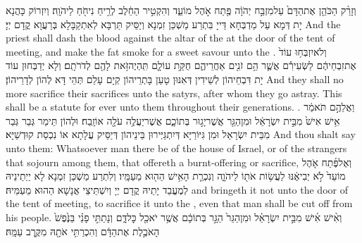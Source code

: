 {וְזָרַ֨ק הַכֹּהֵ֤ן אֶת\maqqaf הַדָּם֙ עַל\maqqaf מִזְבַּ֣ח יְהֹוָ֔ה פֶּ֖תַח אֹ֣הֶל מוֹעֵ֑ד וְהִקְטִ֣יר הַחֵ֔לֶב לְרֵ֥יחַ נִיחֹ֖חַ לַיהֹוָֽה׃}
{וְיִזְרוֹק כָּהֲנָא יָת דְּמָא עַל מַדְבְּחָא דַּייָ בִּתְרַע מַשְׁכַּן זִמְנָא וְיַסֵּיק תַּרְבָּא לְאִתְקַבָּלָא בְּרַעֲוָא קֳדָם יְיָ׃}
{And the priest shall dash the blood against the altar of the \lord\space at the door of the tent of meeting, and make the fat smoke for a sweet savour unto the \lord.}{}
{וְלֹא\maqqaf יִזְבְּח֥וּ עוֹד֙ אֶת\maqqaf זִבְחֵיהֶ֔ם לַשְּׂעִירִ֕ם אֲשֶׁ֛ר הֵ֥ם זֹנִ֖ים אַחֲרֵיהֶ֑ם חֻקַּ֥ת עוֹלָ֛ם תִּֽהְיֶה\maqqaf זֹּ֥את לָהֶ֖ם לְדֹרֹתָֽם׃}
{וְלָא יְדַבְּחוּן עוֹד יָת דִּבְחֵיהוֹן לְשֵׁידִין דְּאִנּוּן טָעַן בָּתְרֵיהוֹן קְיָם עָלַם תְּהֵי דָּא לְהוֹן לְדָרֵיהוֹן׃}
{And they shall no more sacrifice their sacrifices unto the satyrs, after whom they go astray. This shall be a statute for ever unto them throughout their generations. .}{}
{וַאֲלֵהֶ֣ם תֹּאמַ֔ר אִ֥ישׁ אִישׁ֙ מִבֵּ֣ית יִשְׂרָאֵ֔ל וּמִן\maqqaf הַגֵּ֖ר אֲשֶׁר\maqqaf יָג֣וּר בְּתוֹכָ֑ם אֲשֶׁר\maqqaf יַעֲלֶ֥ה עֹלָ֖ה אוֹ\maqqaf זָֽבַח׃}
{וּלְהוֹן תֵּימַר גְּבַר גְּבַר מִבֵּית יִשְׂרָאֵל וּמִן גִּיּוֹרַיָּא דְּיִתְגַּיְּירוּן בֵּינֵיהוֹן דְּיַסֵּיק עֲלָתָא אוֹ נִכְסַת קוּדְשַׁיָּא׃}
{And thou shalt say unto them: Whatsoever man there be of the house of Israel, or of the strangers that sojourn among them, that offereth a burnt-offering or sacrifice,}{}
{וְאֶל\maqqaf פֶּ֜תַח אֹ֤הֶל מוֹעֵד֙ לֹ֣א יְבִיאֶ֔נּוּ לַעֲשׂ֥וֹת אֹת֖וֹ לַיהֹוָ֑ה וְנִכְרַ֛ת הָאִ֥ישׁ הַה֖וּא מֵעַמָּֽיו׃}
{וְלִתְרַע מַשְׁכַּן זִמְנָא לָא יַיְתֵינֵיהּ לְמֶעֱבַד יָתֵיהּ קֳדָם יְיָ וְיִשְׁתֵּיצֵי אֲנָשָׁא הַהוּא מֵעַמֵּיהּ׃}
{and bringeth it not unto the door of the tent of meeting, to sacrifice it unto the \lord, even that man shall be cut off from his people.}{}
{וְאִ֨ישׁ אִ֜ישׁ מִבֵּ֣ית יִשְׂרָאֵ֗ל וּמִן\maqqaf הַגֵּר֙ הַגָּ֣ר בְּתוֹכָ֔ם אֲשֶׁ֥ר יֹאכַ֖ל כׇּל\maqqaf דָּ֑ם וְנָתַתִּ֣י פָנַ֗י בַּנֶּ֙פֶשׁ֙ הָאֹכֶ֣לֶת אֶת\maqqaf הַדָּ֔ם וְהִכְרַתִּ֥י אֹתָ֖הּ מִקֶּ֥רֶב עַמָּֽהּ׃}

